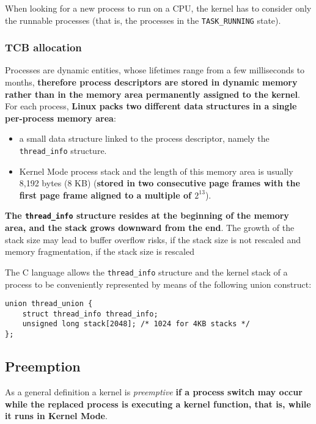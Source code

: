 \documentclass[10pt,a4paper]{article}
\begin{document}
When looking for a new process to run on a CPU, the kernel has to consider only the runnable processes (that is, the processes in the \texttt{TASK\_RUNNING} state).

\subsubsection{TCB allocation}

Processes are dynamic entities, whose lifetimes range from a few milliseconds to months, \textbf{therefore process descriptors are stored in dynamic memory rather than in the memory area permanently assigned to the kernel}. For each process, \textbf{Linux packs two different data structures in a single per-process memory area}:
\begin{itemize}
\item a small data structure linked to the process descriptor, namely the \texttt{thread\_info} structure.
\item Kernel Mode process stack and the length of this memory area is usually 8,192 bytes (8 KB) (\textbf{stored in two consecutive page frames with the first page frame aligned to a multiple of $2^13$}).
\end{itemize}

\textbf{The \texttt{thread\_info} structure resides at the beginning of the memory area, and the stack grows downward from the end}. The growth of the stack size may lead to buffer overflow risks, if the stack size is not rescaled and memory fragmentation, if the stack size is rescaled

The C language allows the \texttt{thread\_info} structure and the kernel stack of a process to be conveniently represented by means of the following union construct:


\begin{lstlisting}[frame=lines]
union thread_union {
    struct thread_info thread_info;
    unsigned long stack[2048]; /* 1024 for 4KB stacks */
};
\end{lstlisting}


\subsection{Preemption}

As a general definition a kernel is \textit{preemptive} \textbf{if a process switch may occur while the replaced process is executing a kernel function, that is, while it runs in Kernel Mode}. 
\end{document}
